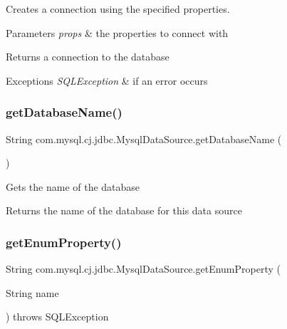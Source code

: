Creates a connection using the specified properties.


\begin{DoxyParams}{Parameters}
{\em props} & the properties to connect with\\
\hline
\end{DoxyParams}
\begin{DoxyReturn}{Returns}
a connection to the database
\end{DoxyReturn}

\begin{DoxyExceptions}{Exceptions}
{\em S\+Q\+L\+Exception} & if an error occurs \\
\hline
\end{DoxyExceptions}
\mbox{\label{classcom_1_1mysql_1_1cj_1_1jdbc_1_1_mysql_data_source_a8a77d80a5db8b80a2957cd3b23121e57}} 
\subsubsection{\texorpdfstring{get\+Database\+Name()}{getDatabaseName()}}
{\footnotesize\ttfamily String com.\+mysql.\+cj.\+jdbc.\+Mysql\+Data\+Source.\+get\+Database\+Name (\begin{DoxyParamCaption}{ }\end{DoxyParamCaption})}

Gets the name of the database

\begin{DoxyReturn}{Returns}
the name of the database for this data source 
\end{DoxyReturn}
\mbox{\label{classcom_1_1mysql_1_1cj_1_1jdbc_1_1_mysql_data_source_aedb4c78ad9bdbcf248e480746018eea1}} 
\subsubsection{\texorpdfstring{get\+Enum\+Property()}{getEnumProperty()}}
{\footnotesize\ttfamily String com.\+mysql.\+cj.\+jdbc.\+Mysql\+Data\+Source.\+get\+Enum\+Property (\begin{DoxyParamCaption}\item[{String}]{name }\end{DoxyParamCaption}) throws S\+Q\+L\+Exception\hspace{0.3cm}{\ttfamily [protected]}}

